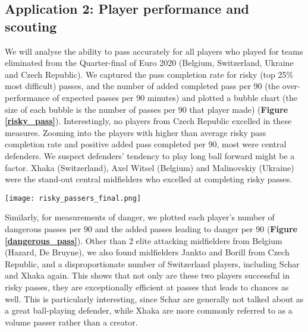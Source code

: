 \documentclass[conference]{IEEEtran}
\begin{document}
\subsection{Application 2: Player performance and scouting}\label{player}

We will analyse the ability to pass accurately for all players who played for teams eliminated from the Quarter-final of Euro 2020 (Belgium, Switzerland, Ukraine and Czech Republic). We captured the pass completion rate for risky (top 25\% most difficult) passes, and the number of added completed pass per 90 (the over-performance of expected passes per 90 minutes) and plotted a bubble chart (the size of each bubble is the number of passes per 90 that player made) (\textbf{Figure \ref{risky_pass}}). Interestingly, no players from Czech Republic excelled in these measures. Zooming into the players with higher than average risky pass completion rate and positive added pass completed per 90, most were central defenders. We suspect defenders' tendency to play long ball forward might be a factor. Xhaka (Switzerland), Axel Witsel (Belgium) and Malinovskiy (Ukraine) were the stand-out central midfielders who excelled at completing risky passes.


\begin{figure*}[htbp]

\centerline{\texttt{[image: risky\_passers\_final.png]}}
\caption{\textbf{On the left: accuracy of risky passers from quarter-finalist teams. On the right: accuracy of passers with higher than average risky pass completion rate and positive added pass completed per 90. Stand-out players: Xhaka, Schar (Switzerland); Krivtsov (Ukraine}; Vermaelen, Boyata (Belgium)}
\label{risky_pass}
\end{figure*}

Similarly, for measurements of danger, we plotted each player's number of dangerous passes per 90 and the added passes leading to danger per 90 (\textbf{Figure \ref{dangerous_pass}}). Other than 2 elite attacking midfielders from Belgium (Hazard, De Bruyne), we also found midfielders Jankto and Borill from Czech Republic, and a disproportionate number of Switzerland players, including Schar and Xhaka again. This shows that not only are these two players successful in risky passes, they are exceptionally efficient at passes that leads to chances as well. This is particularly interesting, since Schar are generally not talked about as a great ball-playing defender, while Xhaka are more commonly referred to as a volume passer rather than a creator.
\end{document}
